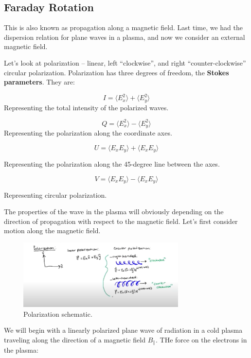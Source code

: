 \documentclass{article}
\begin{document}
\subsection{Faraday Rotation}

This is also known as propagation along a magnetic field. Last time, we had the dispersion relation for plane waves in a plasma, and now we consider an external magnetic field. 

Let's look at polarization -- linear, left ``clockwise'', and right ``counter-clockwise'' circular polarization. Polarization has three degrees of freedom, the \textbf{Stokes parameters}. They are:

$$
I = \langle E_x^2 \rangle + \langle E_y^2 \rangle 
$$
Representing the total intensity of the polarized waves.

$$
Q = \langle E_x^2 \rangle - \langle E_y^2 \rangle 
$$
Representing the polarization along the coordinate axes. 

$$
U = \langle E_x E_y \rangle + \langle E_x E_y \rangle
$$

Representing the polarization along the 45-degree line between the axes.

$$
V = \langle E_x E_y \rangle - \langle E_x E_y \rangle
$$

Representing circular polarization.

The properties of the wave in the plasma will obviously depending on the direction of propagation with respect to the magnetic field. Let's first consider motion along the magnetic field. 

\begin{figure}
    \centering
    \includegraphics[width=0.75\textwidth]{Screen Shot 2020-10-22 at 7.42.12 PM.png}
    \caption{Polarization schematic.}
    \label{fig:polariz}
\end{figure}

We will begin with a linearly polarized plane wave of radiation in a cold plasma traveling along the direction of a magnetic field $B_\parallel$. THe force on the electrons in the plasma:
\end{document}
